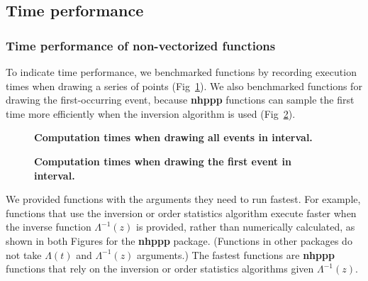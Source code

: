 \documentclass[10pt,letterpaper]{article}
\newcommand{\pkg}[1]{{\bf #1}}
\begin{document}
\newpage
\subsection{Time performance}\label{sec:example-time-performance}

\subsubsection{Time performance of non-vectorized functions}\label{sec:nonvectorized-functions}

To indicate time performance, we benchmarked functions by recording execution times when drawing a series of points (Fig~\ref{fig:comptimes_all_samples}). We also benchmarked functions for drawing the first-occurring event, because \pkg{nhppp} functions can sample the first time more efficiently when the inversion algorithm is used (Fig~\ref{fig:comptimes_one_sample}).



\begin{Schunk}
\begin{figure}[ht!]
\caption[Computation times when drawing all events in interval]{\textbf{Computation times when drawing all events in interval.}}\label{fig:comptimes_all_samples}
%\texttt{[image: figure/comptimes\_all\_samples-1]} 
\end{figure}
\end{Schunk}


\begin{Schunk}
\begin{figure}[ht!]
\caption[Computation times when drawing the first event in interval]{{\bf Computation times when drawing the first event in interval.}}\label{fig:comptimes_one_sample}
%\texttt{[image: figure/comptimes\_one\_sample-1]} 
\end{figure}
\end{Schunk}


We provided functions with the arguments they need to run fastest. For example, functions that use the inversion or order statistics algorithm execute faster when the inverse function $\Lambda^{-1}(z)$ is provided, rather than numerically calculated, as shown in both Figures for the \pkg{nhppp} package. (Functions in other packages do not take $\Lambda(t)$ and $\Lambda^{-1}(z)$ arguments.) The fastest functions are \pkg{nhppp} functions that rely on the inversion or order statistics algorithms given $\Lambda^{-1}(z)$.
\end{document}
